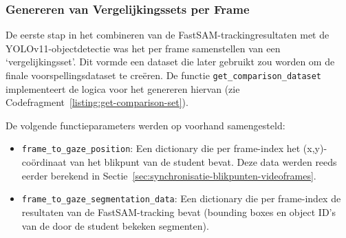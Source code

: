 \subsubsection{Genereren van Vergelijkingssets per Frame}

De eerste stap in het combineren van de FastSAM-trackingresultaten met de YOLOv11-objectdetectie was het per frame samenstellen van een `vergelijkingsset'.
Dit vormde een dataset die later gebruikt zou worden om de finale voorspellingsdataset te creëren.
De functie \texttt{get\_comparison\_dataset} implementeert de logica voor het genereren hiervan (zie Codefragment~\ref{listing:get-comparison-set}).

De volgende functieparameters werden op voorhand samengesteld:
\begin{itemize}
    \item \texttt{frame\_to\_gaze\_position}: Een dictionary die per frame-index het (x,y)-coördinaat van het 
    blikpunt van de student bevat. 
    Deze data werden reeds eerder berekend in Sectie~\ref{sec:synchronisatie-blikpunten-videoframes}.
    \item \texttt{frame\_to\_gaze\_segmentation\_data}: Een dictionary 
    die per frame-index de resultaten van de FastSAM-tracking bevat (bounding boxes en object ID's van de door de student bekeken segmenten).
\end{itemize}

